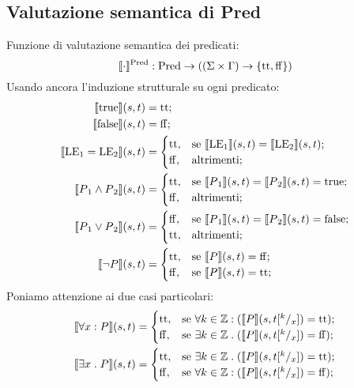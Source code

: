 \subsection{Valutazione semantica di Pred}
Funzione di valutazione semantica dei predicati:
\[
\llbracket \cdot \rrbracket ^{\mathrm{Pred}}: \mathrm{Pred} \rightarrow ((\Sigma \times \Gamma) \rightarrow \{\mathrm{tt},\mathrm{ff} \})
\]
Usando ancora l'induzione strutturale su ogni predicato:
\begin{align*}
   \llbracket \mathrm{true} \rrbracket(s,t) 
      &= \mathrm{tt};\\
   \llbracket \mathrm{false} \rrbracket(s,t) 
      &= \mathrm{ff};\\
   \llbracket \mathrm{LE}{_1} = \mathrm{LE}{_2}\rrbracket(s,t) 
      &=
        \begin{cases}
                \mathrm{tt}, &\text{se $\llbracket\mathrm{LE}{_1}\rrbracket(s,t) = \llbracket \mathrm{LE}{_2} \rrbracket(s,t)$};\\
                \mathrm{ff}, &\text{altrimenti};
        \end{cases}\\
    \llbracket P{_1} \wedge P{_2}\rrbracket(s,t) 
      &=
        \begin{cases}
                \mathrm{tt}, &\text{se $\llbracket P{_1}\rrbracket(s,t) = \llbracket P{_2}\rrbracket(s,t) = \mathrm{true}$};\\
                \mathrm{ff}, &\text{altrimenti};
        \end{cases}\\
    \llbracket P{_1} \vee P{_2}\rrbracket(s,t) 
      &=
        \begin{cases}
                \mathrm{ff}, &\text{se $\llbracket P{_1}\rrbracket(s,t) = \llbracket P{_2}\rrbracket(s,t) = \mathrm{false}$};   \\
                \mathrm{tt}, &\text{altrimenti};
        \end{cases} \\
    \llbracket \neg P\rrbracket(s,t) 
       &=
        \begin{cases}
                \mathrm{tt},&\text{se $\llbracket P\rrbracket(s,t) = \mathrm{ff}$};\\
                \mathrm{ff},&\text{se $\llbracket P\rrbracket(s,t) = \mathrm{tt}$};
        \end{cases}
\end{align*}
Poniamo attenzione ai due casi particolari:
\begin{align*}
   \llbracket\forall x \mathrel{:} P\rrbracket(s,t) 
      &=
        \begin{cases}
                \mathrm{tt}, &\text{se $\forall k\in\mathbb{Z}\mathrel{:}(\llbracket P\rrbracket(s,t[^k/_x]) = \mathrm{tt}$});\\
                \mathrm{ff}, &\text{se $\exists k\in\mathbb{Z}\mathrel{.}(\llbracket P\rrbracket(s,t[^k/_x]) = \mathrm{ff}$});
        \end{cases}\\
   \llbracket \exists x \mathrel{.} P\rrbracket(s,t) 
      &=
        \begin{cases}
                \mathrm{tt},  &\text{se $\exists k\in \mathbb{Z}\mathrel{.}(\llbracket P\rrbracket(s,t[^ k/_x]) = \mathrm{tt}$});\\
                \mathrm{ff},  &\text{se $\forall k\in \mathbb{Z}\mathrel{:}(\llbracket P\rrbracket(s,t[^k/_x]) = \mathrm{ff}$});
        \end{cases}
\end{align*}
